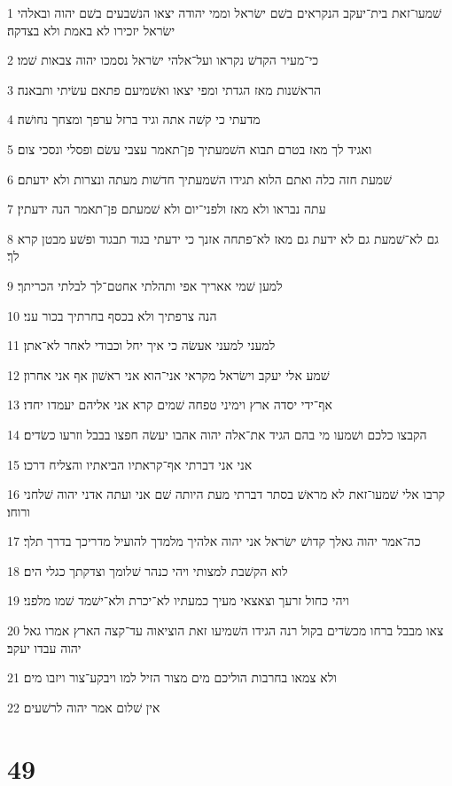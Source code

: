\par 1 שׁמעו־זאת בית־יעקב הנקראים בשׁם ישׂראל וממי יהודה יצאו הנשׁבעים בשׁם יהוה ובאלהי ישׂראל יזכירו לא באמת ולא בצדקה׃
\par 2 כי־מעיר הקדשׁ נקראו ועל־אלהי ישׂראל נסמכו יהוה צבאות שׁמו׃
\par 3 הראשׁנות מאז הגדתי ומפי יצאו ואשׁמיעם פתאם עשׂיתי ותבאנה׃
\par 4 מדעתי כי קשׁה אתה וגיד ברזל ערפך ומצחך נחושׁה׃
\par 5 ואגיד לך מאז בטרם תבוא השׁמעתיך פן־תאמר עצבי עשׂם ופסלי ונסכי צום׃
\par 6 שׁמעת חזה כלה ואתם הלוא תגידו השׁמעתיך חדשׁות מעתה ונצרות ולא ידעתם׃
\par 7 עתה נבראו ולא מאז ולפני־יום ולא שׁמעתם פן־תאמר הנה ידעתין׃
\par 8 גם לא־שׁמעת גם לא ידעת גם מאז לא־פתחה אזנך כי ידעתי בגוד תבגוד ופשׁע מבטן קרא לך׃
\par 9 למען שׁמי אאריך אפי ותהלתי אחטם־לך לבלתי הכריתך׃
\par 10 הנה צרפתיך ולא בכסף בחרתיך בכור עני׃
\par 11 למעני למעני אעשׂה כי איך יחל וכבודי לאחר לא־אתן׃
\par 12 שׁמע אלי יעקב וישׂראל מקראי אני־הוא אני ראשׁון אף אני אחרון׃
\par 13 אף־ידי יסדה ארץ וימיני טפחה שׁמים קרא אני אליהם יעמדו יחדו׃
\par 14 הקבצו כלכם ושׁמעו מי בהם הגיד את־אלה יהוה אהבו יעשׂה חפצו בבבל וזרעו כשׂדים׃
\par 15 אני אני דברתי אף־קראתיו הביאתיו והצליח דרכו׃
\par 16 קרבו אלי שׁמעו־זאת לא מראשׁ בסתר דברתי מעת היותה שׁם אני ועתה אדני יהוה שׁלחני ורוחו׃
\par 17 כה־אמר יהוה גאלך קדושׁ ישׂראל אני יהוה אלהיך מלמדך להועיל מדריכך בדרך תלך׃
\par 18 לוא הקשׁבת למצותי ויהי כנהר שׁלומך וצדקתך כגלי הים׃
\par 19 ויהי כחול זרעך וצאצאי מעיך כמעתיו לא־יכרת ולא־ישׁמד שׁמו מלפני׃
\par 20 צאו מבבל ברחו מכשׂדים בקול רנה הגידו השׁמיעו זאת הוציאוה עד־קצה הארץ אמרו גאל יהוה עבדו יעקב׃
\par 21 ולא צמאו בחרבות הוליכם מים מצור הזיל למו ויבקע־צור ויזבו מים׃
\par 22 אין שׁלום אמר יהוה לרשׁעים׃

\chapter{49}

